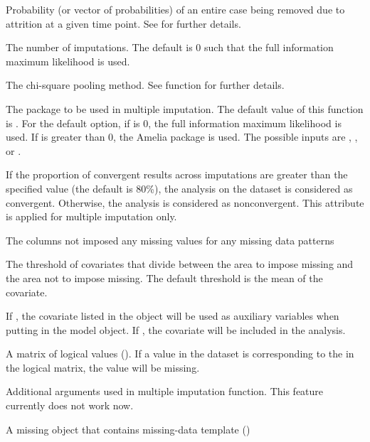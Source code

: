 \documentclass[a4paper]{book}
\begin{document}
\begin{Arguments}
\begin{ldescription}
\item[\code{prAttr}] Probability (or vector of probabilities) of an entire case being removed due to attrition at a given time point. See  for further details.
\item[\code{m}] The number of imputations. The default is 0 such that the full information maximum likelihood is used.
\item[\code{chi}] The chi-square pooling method. See  function for further details.
\item[\code{package}] The package to be used in multiple imputation. The default value of this function is . For the default option, if  is 0, the full information maximum likelihood is used. If  is greater than 0, the Amelia package is used. The possible inputs are , , or .
\item[\code{convergentCutoff}] If the proportion of convergent results across imputations are greater than the specified value (the default is 80\%), the analysis on the dataset is considered as convergent. Otherwise, the analysis is considered as nonconvergent. This attribute is applied for multiple imputation only. 
\item[\code{ignoreCols}] The columns not imposed any missing values for any missing data patterns
\item[\code{threshold}] The threshold of covariates that divide between the area to impose missing and the area not to impose missing. The default threshold is the mean of the covariate.
\item[\code{covAsAux}] If , the covariate listed in the object will be used as auxiliary variables when putting in the model object. If , the covariate will be included in the analysis.
\item[\code{logical}] A matrix of logical values (). If a value in the dataset is corresponding to the  in the logical matrix, the value will be missing.
\item[\code{...}] Additional arguments used in multiple imputation function. This feature currently does not work now.
\end{ldescription}
\end{Arguments}
%
\begin{Value}
A missing object that contains missing-data template ()
\end{Value}
\end{document}

